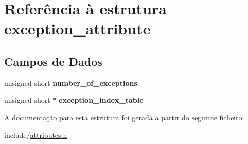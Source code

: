 \hypertarget{structexception__attribute}{}\section{Referência à estrutura exception\+\_\+attribute}
\label{structexception__attribute}
\subsection*{Campos de Dados}
\begin{DoxyCompactItemize}
\item 
\mbox{\label{structexception__attribute_a40daaffb1cea794d6b65513bc7639d88}} 
unsigned short {\bfseries number\+\_\+of\+\_\+exceptions}
\item 
\mbox{\label{structexception__attribute_a017de83073154b04633ebe00dfb77932}} 
unsigned short $\ast$ {\bfseries exception\+\_\+index\+\_\+table}
\end{DoxyCompactItemize}


A documentação para esta estrutura foi gerada a partir do seguinte ficheiro\+:\begin{DoxyCompactItemize}
\item 
include/\hyperlink{attributes_8h}{attributes.\+h}\end{DoxyCompactItemize}
